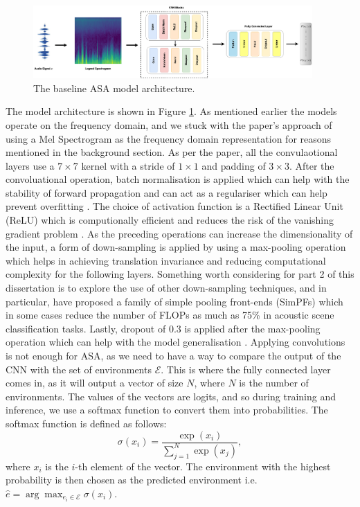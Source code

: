 \documentclass[logo,bsc,singlespacing,parskip,online]{infthesis}
\begin{document}
\begin{figure}[h]
   \centering
   \includegraphics[width=0.95\textwidth]{cnn-diagram.png}
   \caption{The baseline ASA model architecture.}
   \label{fig:cnn-model-architecture}
\end{figure}
The model architecture is shown in Figure \ref{fig:cnn-model-architecture}. As 
mentioned earlier the models operate on the frequency domain, and 
we stuck with the paper's approach of using a Mel Spectrogram as the 
frequency domain representation for reasons mentioned in the background section. 
As per the paper, all the convulaotional layers use a $7 \times 7$ kernel
with a stride of $1 \times 1$ and padding of $3 \times 3$. After the convoluational operation, 
batch normalisation is applied which can help with the stability of forward propagation 
and can act as a regulariser which can help prevent overfitting \citep{prince2023understanding}.
The choice of activation function is a Rectified Linear Unit (ReLU) which is computionally 
efficient and reduces the risk of the vanishing gradient problem \citep{prince2023understanding}.
As the preceding operations can increase the dimensionality of the input, a form of down-sampling is applied by using a max-pooling operation which helps in achieving 
translation invariance and reducing computational complexity for the following layers. Something worth considering for 
part 2 of this dissertation is to explore the use of other down-sampling techniques, and in particular,
\citet{liu_simple_2023} have proposed a family of simple pooling front-ends (SimPFs) 
which in some cases reduce the number of FLOPs as much as 75\% in acoustic scene classification tasks. 
Lastly, dropout of 0.3 is applied after the max-pooling operation which can help with 
the model generalisation \citep{prince2023understanding}.
Applying convolutions is not enough for ASA, 
as we need to have a way to compare the output of the CNN with the set of environments \(\mathcal{E}\).
This is where the fully connected layer comes in, as it will output a vector of size \(N\), where \(N\) is the number of environments.
The values of the vectors are logits, and so during training and inference, we use a softmax function to convert them into probabilities.
The softmax function is defined as follows:
\[
\sigma(x_i) = \frac{\exp(x_i)}{\sum_{j=1}^{N} \exp(x_j)},
\]
where \(x_i\) is the \(i\)-th element of the vector.
The environment with the highest probability is then chosen as the predicted environment 
i.e. \(\hat{e} = \arg\max_{e_i \in \mathcal{E}} \sigma(x_i)\).
\end{document}
